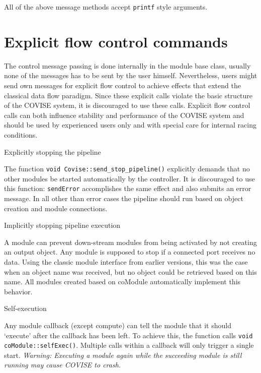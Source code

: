 All of the above message methods accept \texttt{printf} style arguments.

\section{Explicit flow control commands}
\latexonly
{}
\endlatexonly

The control message passing is done internally in the module base class, usually 
none of the messages has to be sent by the user himself. Nevertheless, users 
might send own messages for explicit flow control to achieve effects that 
extend the classical data flow paradigm. Since these explicit calls violate the 
basic structure of the COVISE system, it is discouraged to use these calls. 
Explicit flow control calls can both influence stability and performance of 
the COVISE system and should be used by experienced users only and with special care for internal racing conditions.

\vspace*{1cm}
{\Large Explicitly stopping the pipeline}
\vspace*{0.5cm}

The function {\tt void Covise::send\_stop\_pipeline()} explicitly demands that 
no other modules be started automatically by the controller. It is
discouraged to use this function: {\tt sendError} accomplishes the same 
effect and also submits an error message. In all other than error cases the 
pipeline should run based on object creation and module connections. 

\vspace*{1cm}
{\Large Implicitly stopping pipeline execution}
\vspace*{0.5cm}

A module can prevent down-stream modules from being activated by not creating an 
output object.  Any module is supposed to stop if a connected port receives
no data. Using the classic module interface from earlier versions, this was 
the case when an object name was received, but no object could be retrieved
based on this name. All modules created based on coModule automatically 
implement this behavior.

\vspace*{1cm}
{\Large Self-execution}
\vspace*{0.5cm}

Any module callback (except compute) can tell the module that it should 
`execute' after the callback has been left. To achieve this, the function 
calls {\tt void coModule::selfExec()}. Multiple calls within a callback will 
only trigger a single start. \emph{Warning: Executing a module again while the 
succeeding module is still running may cause COVISE to crash.}

